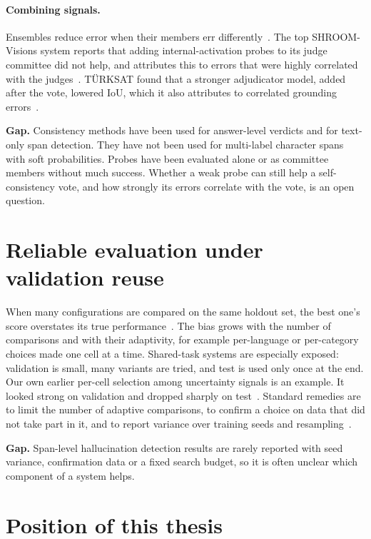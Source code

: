 \paragraph{Combining signals.}
Ensembles reduce error when their members err differently~\cite{dietterich2000ensemble}. The top SHROOM-Visions system reports that adding internal-activation probes to its judge committee did not help, and attributes this to errors that were highly correlated with the judges~\cite{vroomvroom2026}. TÜRKSAT found that a stronger adjudicator model, added after the vote, lowered IoU, which it also attributes to correlated grounding errors~\cite{karamanlioglu2026turksat}.

\textbf{Gap.} Consistency methods have been used for answer-level verdicts and for text-only span detection. They have not been used for multi-label character spans with soft probabilities. Probes have been evaluated alone or as committee members without much success. Whether a weak probe can still help a self-consistency vote, and how strongly its errors correlate with the vote, is an open question.

\section{Reliable evaluation under validation reuse}

When many configurations are compared on the same holdout set, the best one's score overstates its true performance~\cite{dwork2015reusable}. The bias grows with the number of comparisons and with their adaptivity, for example per-language or per-category choices made one cell at a time. Shared-task systems are especially exposed: validation is small, many variants are tried, and test is used only once at the end. Our own earlier per-cell selection among uncertainty signals is an example. It looked strong on validation and dropped sharply on test~\cite{rattanajaratkul2026smurfcat}. Standard remedies are to limit the number of adaptive comparisons, to confirm a choice on data that did not take part in it, and to report variance over training seeds and resampling~\cite{efron1993bootstrap}.

\textbf{Gap.} Span-level hallucination detection results are rarely reported with seed variance, confirmation data or a fixed search budget, so it is often unclear which component of a system helps.

\section{Position of this thesis}

